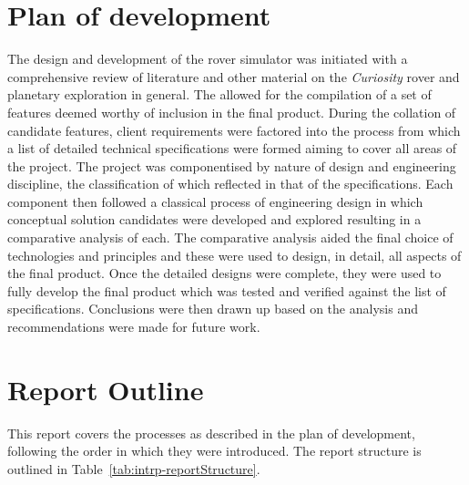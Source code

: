 \section{Plan of development}
  The design and development of the rover simulator was initiated with a comprehensive review of literature and other material on the \textit{Curiosity} rover and planetary exploration in general. The allowed for the compilation of a set of features deemed worthy of inclusion in the final product. During the collation of candidate features, client requirements were factored into the process from which a list of detailed technical specifications were formed aiming to cover all areas of the project. The project was componentised by nature of design and engineering discipline, the classification of which reflected in that of the specifications. Each component then followed a classical process of engineering design in which conceptual solution candidates were developed and explored resulting in a comparative analysis of each. The comparative analysis aided the final choice of technologies and principles and these were used to design, in detail, all aspects of the final product. Once the detailed designs were complete, they were used to fully develop the final product which was tested and verified against the list of specifications. Conclusions were then drawn up based on the analysis and recommendations were made for future work.
  
\section{Report Outline}
  This report covers the processes as described in the plan of development, following the order in which they were introduced. The report structure is outlined in Table~\ref{tab:intrp-reportStructure}.
  
